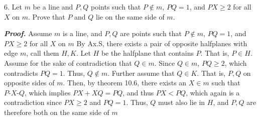 \documentclass{report}
\begin{document}
    \pagebreak \bigbreak \noindent 
    \begin{mdframed}
        6. Let $m$ be a line and $P,Q$ points such that $P \not\in m$, $PQ = 1$, and $PX \geq 2$ for all $X$ on $m$. Prove that $P$ and $Q$ lie on the same side of $m$.
    \end{mdframed}
    \bigbreak \noindent 
    \textbf{\textit{Proof.}} Assume $m$ is a line, and $P,Q$ are points such that $P\not\in m$, $PQ = 1$, and $PX \geq 2$ for all $X$ on $m$
    \bigbreak \noindent 
    By Ax.S, there exists a pair of opposite halfplanes with edge $m$, call them $H,K$. Let $H$ be the halfplane that contains $P$. That is, $P \in H$.
    \bigbreak \noindent 
    Assume for the sake of contradiction that $Q \in m$. Since $Q \in m$, $PQ \geq 2$, which contradicts $PQ = 1$. Thus, $Q \not\in m$.
    \bigbreak \noindent 
    Further assume that $Q \in K$. That is, $P,Q$ on opposite sides of $m$. Then, by theorem 10.6, there exists an $X \in m$ such that $ P\text{-}X\text{-}Q$, which implies $PX + XQ = PQ$, and thus $PX < PQ$, which again is a contradiction since $PX \geq 2$ and $PQ  =1$. 
    \bigbreak \noindent 
    Thus, $Q$ must also lie in $H$, and $P,Q$ are therefore both on the same side of $m$ \endpf
\end{document}

